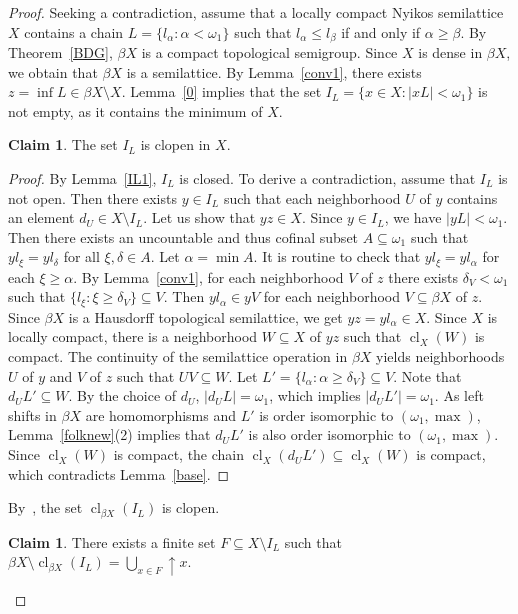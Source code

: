 \documentclass[12pt, twoside, leqno]{article}
\theoremstyle{definition}
\newtheorem{claim}[theorem]{Claim}
\numberwithin{equation}{section}
\newcommand{\w}{\omega}
\newcommand{\cl}{\operatorname{cl}}
\begin{document}
\begin{proof}
Seeking a contradiction, assume that a locally compact Nyikos semilattice $X$ contains a chain $L=\{l_{\alpha}:\alpha<\w_1\}$ such that $l_{\alpha}\leq l_{\beta}$ if and only if $\alpha\geq \beta$. By Theorem~\ref{BDG}, $\beta X$ is a compact topological semigroup. Since $X$ is dense in $\beta X$, we obtain that $\beta X$ is a semilattice. By Lemma~\ref{conv1}, there exists $z=\inf L\in \beta X\setminus X$.
Lemma~\ref{0} implies that the set $I_L=\{x\in X: |xL|<\w_1\}$ is not empty, as it contains the minimum of $X$. 

\begin{claim}\label{clopen}
The set $I_L$ is clopen in $X$.    
\end{claim}

\begin{proof}
By Lemma~\ref{IL1}, $I_L$ is closed. To derive a contradiction, assume that $I_L$ is not open. Then there exists $y\in I_L$ such that each neighborhood $U$ of $y$ contains an element $d_U\in X\setminus I_L$.   
Let us show that $yz\in X$. Since $y\in I_L$, we have $|yL|<\w_1$. Then there exists an uncountable and thus cofinal subset $A\subseteq \w_1$ such that $yl_\xi=yl_\delta$ for all $\xi,\delta\in A$. Let $\alpha=\min A$. It is routine to check that $yl_{\xi}=yl_{\alpha}$ for each $\xi\geq \alpha$. By Lemma~\ref{conv1}, for each neighborhood $V$ of $z$ there exists $\delta_V<\w_1$ such that $\{l_\xi: \xi\geq \delta_V\}\subseteq V$. Then $yl_{\alpha}\in yV$ for each neighborhood $V\subseteq \beta X$ of $z$. Since $\beta X$ is a Hausdorff topological semilattice, we get $yz=yl_{\alpha}\in X$. Since $X$ is locally compact, there is a neighborhood $W\subseteq X$ of $yz$ such that $\cl_X(W)$ is compact. The continuity of the semilattice operation in $\beta X$ yields neighborhoods $U$ of $y$ and $V$ of $z$ such that $UV\subseteq W$. 
Let $L'=\{l_{\alpha}:\alpha\geq \delta_V\}\subseteq V$. Note that $d_UL'\subseteq W$. By the choice of $d_U$, $|d_UL|=\w_1$, which implies $|d_UL'|=\w_1$. As left shifts in $\beta X$ are homomorphisms and $L'$ is order isomorphic to $(\w_1,\max)$, Lemma~\ref{folknew}(2) implies that $d_U L'$ is also order isomorphic to $(\w_1,\max)$. 
Since $\cl_X(W)$ is compact, the chain $\cl_X(d_UL')\subseteq \cl_X(W)$ is compact, which contradicts Lemma~\ref{base}.
\end{proof}

By~\cite[Corollary 3.6.5]{Eng}, the set $\cl_{\beta X}(I_L)$ is clopen. 


\begin{claim}\label{cool}
There exists a finite set $F\subseteq X\setminus I_L$ such that $\beta X\setminus\cl_{\beta X}(I_L)=\bigcup_{x\in F}{\uparrow}x$.
\end{claim}


\end{proof}
\end{document}

